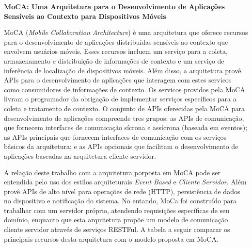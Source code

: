 \textbf{MoCA: Uma Arquitetura para o Desenvolvimento de Aplicações Sensíveis ao Contexto para Dispositivos Móveis}\par
MoCA (\textit{Mobile Collaboration Architecture}) é uma arquitetura que oferece recursos para o desenvolvimento de aplicações distribuídas sensíveis ao contexto que envolvem usuários móveis. Esses recursos incluem um serviço para a coleta, armazenamento e distribuição de informações de contexto e um serviço de inferência de localização de dispositivos móveis. Além disso, a arquitetura provê APIs para o desenvolvimento de aplicações que interagem com estes servicos como consumidores de informações de contexto. Os servicos providos pela MoCA livram o programador da obrigação de implementar serviços específicos para a coleta e tratamento de contexto. O conjunto de APIs oferecidas pela MoCA para desenvolvimento de aplicações compreende tres grupos: as APIs de comunicação, que fornecem interfaces de comunicação sícrona e assícrona (baseada em eventos); as APIs principais que fornecem interfaces de comunicação com os serviços básicos da arquitetura; e as APIs opcionais que facilitam o desenvolvimento de aplicações baseadas na arquitetura cliente-servidor.\par

A relação deste trabalho com a arquitetura porposta em MoCA pode ser entendida pelo uso dos estilos arquiteturais \textit{Event Based} e \textit{Cliente Servidor}. Além provê APIs de alto nível para operações de rede (HTTP), persistência de dados no dispositivo e notificação do sistema. No entando, MoCa foi construído para trabalhar com um servidor próprio, atendendo requisições específicas de seu domínio, enquanto que esta arquitetura propõe um modelo de comunicação cliente servidor através de serviços RESTFul. A tabela a seguir comparar os principais recursos desta arquitetura com o modelo proposta em MoCA.

